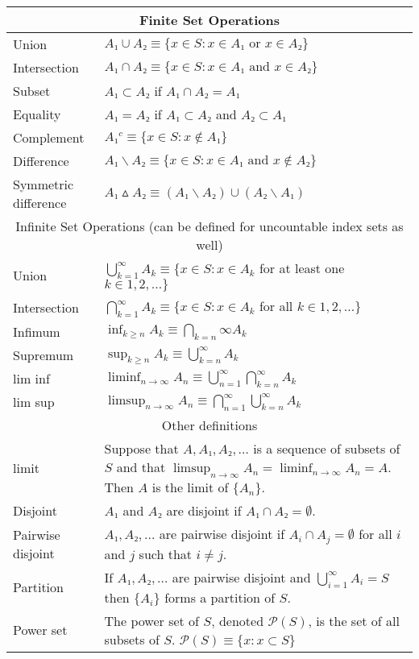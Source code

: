\begin{fullwidth}
\begin{tabular}{lp{4in}}
  \toprule
  \multicolumn{2}{c}{Finite Set Operations} \\
  \midrule
  Union        & $A₁ ∪ A₂ ≡ \{x ∈ S : x ∈ A₁ \text{ or } x∈ A₂\}$ \\
  Intersection & $A₁ ∩ A₂ ≡ \{x ∈ S : x ∈ A₁ \text{ and } x ∈ A₂\}$ \\
  Subset       & $A₁ ⊂ A₂$ if $A₁ ∩ A₂ = A₁$ \\
  Equality     & $A₁ = A₂$ if $A₁ ⊂ A₂$ and $A₂ ⊂ A₁$ \\
  Complement   & $A₁^c ≡ \{x ∈ S : x ∉ A₁\}$ \\
  Difference   & $A₁ ∖ A₂ ≡ \{x ∈ S : x ∈ A₁ \text{ and } x ∉ A₂\}$ \\
  Symmetric difference & $A₁ ▵ A₂ ≡ (A₁ ∖ A₂) ∪ (A₂ ∖ A₁)$ \\
  \midrule
  \multicolumn{2}{c}{Infinite Set Operations (can be defined for uncountable index sets as well)} \\
  \midrule
  Union        & $⋃_{k=1}^∞ A_k ≡ \{x ∈ S : x ∈ A_k$ for at least one $k ∈ 1,2,…\}$ \\
  Intersection & $⋂_{k=1}^∞ A_k ≡ \{x ∈ S : x ∈ A_k$ for all $k ∈ 1,2,…\}$ \\
  Infimum      & $\inf_{k ≥ n} A_k ≡ ⋂_{k=n}∞ A_k$ \\
  Supremum     & $\sup_{k ≥ n} A_k ≡ ⋃_{k=n}^∞ A_k$ \\
  lim inf      & $\liminf_{n \to ∞} A_n ≡ ⋃_{n=1}^∞ ⋂_{k=n}^∞ A_k$ \\
  lim sup      & $\limsup_{n \to ∞} A_n ≡ ⋂_{n=1}^∞ ⋃_{k=n}^∞ A_k$ \\
  \midrule
  \multicolumn{2}{c}{Other definitions} \\
  \midrule
  limit 
  & Suppose that $A, A₁, A₂, …$ is a sequence of subsets of $S$ and that $\limsup_{n → ∞} A_n = \liminf_{n → ∞} A_n = A$.
  Then $A$ is the limit of $\{A_n\}$. \\
  Disjoint 
  & $A₁$ and $A₂$ are disjoint if $A₁ ∩ A₂ = ∅$. \\
  Pairwise disjoint 
  & $A₁, A₂, …$ are pairwise disjoint if $A_i ∩ A_j = ∅$ for all $i$ and $j$ such that $i ≠ j$. \\
  Partition & If $A₁,A₂,…$ are pairwise disjoint and $⋃_{i=1}^∞ A_i = S$ then $\{A_i\}$ forms a partition of $S$. \\
  Power set & The power set of $S$, denoted $\mathcal{P}(S)$, is the set of all subsets of $S$.
  $\mathcal{P}(S) ≡ \{x : x ⊂ S\}$ \\
\bottomrule
\end{tabular}
\end{fullwidth}

